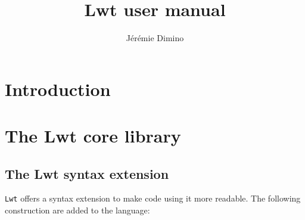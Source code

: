 \documentclass{article}
\title{Lwt user manual}
\author{Jérémie Dimino}
\newcommand{\lwt}{\texttt{Lwt}\xspace}
\begin{document}
\maketitle


\setcounter{tocdepth}{2}
\tableofcontents

\section{Introduction}

\section{The Lwt core library}

\subsection{The Lwt syntax extension}

\lwt offers a syntax extension to make code using it more readable.
The following construction are added to the language:
\end{document}
